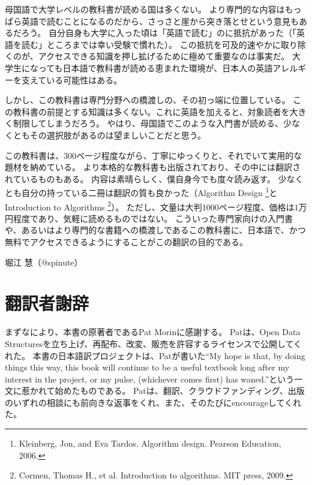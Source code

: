 母国語で大学レベルの教科書が読める国は多くない。
より専門的な内容はもっぱら英語で読むことになるのだから、さっさと崖から突き落とせという意見もあるだろう。
自分自身も大学に入った頃は「英語で読む」のに抵抗があった（「英語を読む」ところまでは幸い受験で慣れた）。
この抵抗を可及的速やかに取り除くのが、アクセスできる知識を押し拡げるために極めて重要なのは事実だ。
大学生になっても日本語で教科書が読める恵まれた環境が、日本人の英語アレルギーを支えている可能性はある。

しかし、この教科書は専門分野への橋渡しの、その初っ端に位置している。
この教科書の前提とする知識は多くない。これに英語を加えると、対象読者を大きく制限してしまうだろう。
やはり、母国語でこのような入門書が読める、少なくともその選択肢があるのは望ましいことだと思う。

この教科書は、300ページ程度ながら、丁寧にゆっくりと、それでいて実用的な題材を納めている。
より本格的な教科書も出版されており、その中には翻訳されているものもある。
内容は素晴らしく、僕自身今でも度々読み返す。
少なくとも自分の持っている二冊は翻訳の質も良かった（Algorithm Design \footnote{Kleinberg, Jon, and Eva Tardos. Algorithm design. Pearson Education, 2006.}とIntroduction to Algorithms \footnote{Cormen, Thomas H., et al. Introduction to algorithms. MIT press, 2009.}）。
ただし、文量は大判1000ページ程度、価格は1万円程度であり、気軽に読めるものではない。
こういった専門家向けの入門書や、あるいはより専門的な書籍への橋渡しであるこの教科書に、日本語で、かつ無料でアクセスできるようにすることがこの翻訳の目的である。

堀江 慧（@spinute）

\section*{翻訳者謝辞}

まずなにより、本書の原著者であるPat Morinに感謝する。
Patは、Open Data Structuresを立ち上げ、再配布、改変、販売を許容するライセンスで公開してくれた。
本書の日本語訳プロジェクトは、Patが書いた``My hope is that, by doing things this way, this book will continue to be a useful textbook long after my interest in the project, or my pulse, (whichever comes first) has waned.''という一文に惹かれて始めたものである。
Patは、翻訳、クラウドファンディング、出版のいずれの相談にも前向きな返事をくれ、また、そのたびにencourageしてくれた。

